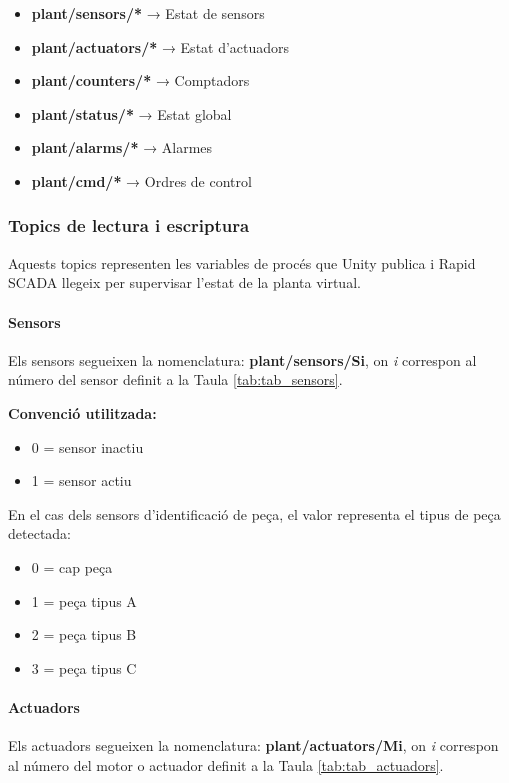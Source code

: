 \documentclass[a4paper,11pt,DIV=13,headings=normal,abstract=true,twoside=semi]{article}
\begin{document}
\begin{itemize}
\item \textbf{plant/sensors/*} → Estat de sensors
\item \textbf{plant/actuators/*} → Estat d'actuadors
\item \textbf{plant/counters/*} → Comptadors
\item \textbf{plant/status/*} → Estat global
\item \textbf{plant/alarms/*} → Alarmes
\item \textbf{plant/cmd/*} → Ordres de control
\end{itemize}

\subsubsection{Topics de lectura i escriptura}


Aquests topics representen les variables de procés que Unity publica i Rapid SCADA llegeix per supervisar l'estat de la planta virtual.

\paragraph{Sensors}

Els sensors segueixen la nomenclatura: \textbf{plant/sensors/Si},  on \textit{i} correspon al número del sensor definit a la Taula \ref{tab:tab_sensors}.


\textbf{Convenció utilitzada:}

\begin{itemize}
\item 0 = sensor inactiu
\item 1 = sensor actiu
\end{itemize}

En el cas dels sensors d'identificació de peça, el valor representa el tipus de peça detectada:


\begin{itemize}
\item 0 = cap peça
\item 1 = peça tipus A
\item 2 = peça tipus B
\item 3 = peça tipus C
\end{itemize}
\paragraph{Actuadors}
Els actuadors segueixen la nomenclatura: \textbf{plant/actuators/Mi}, on \textit{i} correspon al número del motor o actuador definit a la Taula \ref{tab:tab_actuadors}.
\end{document}
